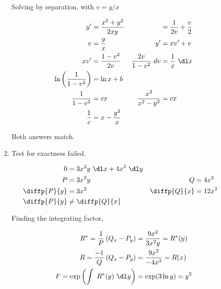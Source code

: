 \begin{enumerate}
\begin{enumerate}
                    Solving by separation, with $ v = y/x $

                    \begin{align}
                        y'                          & = \frac{x^{2} + y^{2}}{2xy}  &
                                                    & = \frac{1}{2v} + \frac{v}{2}   \\
                        v                           & = \frac{y}{x}                &
                        y'                          & = xv' + v                      \\
                        xv'                         & =  \frac{1 - v^{2}}{2v}      &
                        \frac{2v}{1 - v^{2}}\ dv    & = \frac{1}{x}\ \dl x           \\
                        \ln \left( \frac{1}{1 - v^{2}} \right)
                                                    & = \ln x + b                    \\
                        \frac{1}{1 - v^{2}}         & = cx                         &
                        \frac{x^{2}}{x^{2} - y^{2}} & = cx                           \\
                        \frac{1}{c}                 & = x - \frac{y^{2}}{x}
                    \end{align}

                    Both answers match.

              \item Test for exactness failed.

                    \begin{align}
                        0            & = 3x^{2}y\ \dl x + 4x^{3}\ \dl y   \\
                        P            & = 3x^{2}y                        &
                        Q            & = 4x^{3}                           \\
                        \diffp{P}{y} & = 3x^{2}                         &
                        \diffp{Q}{x} & = 12x^{2}                          \\
                        \diffp{P}{y} & \neq \diffp{Q}{x}
                    \end{align}

                    Finding the integrating factor,

                    \begin{align}
                        R^{*} = \frac{1}{P} \left( Q_{x} - P_{y} \right)
                         & = \frac{9x^{2}}{3x^{2}y} = R^{*}(y) \\
                        R = \frac{-1}{Q}\left( Q_{x} - P_{y} \right)
                         & = \frac{9x^{2}}{-4x^{3}} = R(x)     \\
                        F = \exp \left( \int\ R^{*}(y)\ \dl y\right)
                         & = \exp (3\ln y) = y^{3}
                    \end{align}


\end{enumerate}
\end{enumerate}
